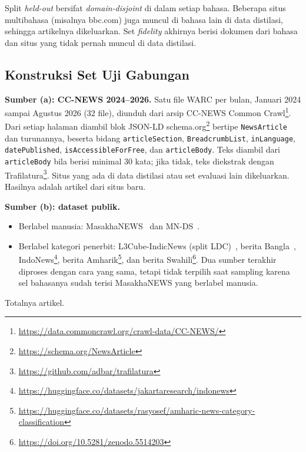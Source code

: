 \documentclass[journal]{IEEEtran}
\newcommand{\eng}[1]{\textit{#1}}   %
\begin{document}
Split \eng{held-out} bersifat \eng{domain-disjoint} di dalam setiap bahasa. Beberapa situs multibahasa (misalnya bbc.com) juga muncul di bahasa lain di data distilasi, sehingga artikelnya dikeluarkan. Set \eng{fidelity} akhirnya berisi  dokumen dari  bahasa dan  situs yang tidak pernah muncul di data distilasi.

\subsection{Konstruksi Set Uji Gabungan}
\label{sec:testset}
\textbf{Sumber (a): CC-NEWS 2024--2026.} Satu file WARC per bulan, Januari 2024 sampai Agustus 2026 (32 file), diunduh dari arsip CC-NEWS Common Crawl\footnote{\url{https://data.commoncrawl.org/crawl-data/CC-NEWS/}}. Dari setiap halaman diambil blok JSON-LD schema.org\footnote{\url{https://schema.org/NewsArticle}} bertipe \texttt{NewsArticle} dan turunannya, beserta bidang \texttt{articleSection}, \texttt{BreadcrumbList}, \texttt{inLanguage}, \texttt{datePublished}, \texttt{isAccessibleForFree}, dan \texttt{articleBody}. Teks diambil dari \texttt{articleBody} bila berisi minimal 30 kata; jika tidak, teks diekstrak dengan Trafilatura\footnote{\url{https://github.com/adbar/trafilatura}}. Situs yang ada di data distilasi atau set evaluasi lain dikeluarkan. Hasilnya adalah  artikel dari situs baru.

\textbf{Sumber (b): dataset publik.}
\begin{itemize}
  \item Berlabel manusia: MasakhaNEWS~\cite{adelani2023masakhanews} dan MN-DS~\cite{petukhova2023mnds}.
  \item Berlabel kategori penerbit: L3Cube-IndicNews (split LDC)~\cite{mirashi2023indicnews}, berita Bangla~\cite{hossain2025banglanews}, IndoNews\footnote{\url{https://huggingface.co/datasets/jakartaresearch/indonews}}, berita Amharik\footnote{\url{https://huggingface.co/datasets/rasyosef/amharic-news-category-classification}}, dan berita Swahili\footnote{\url{https://doi.org/10.5281/zenodo.5514203}}. Dua sumber terakhir diproses dengan cara yang sama, tetapi tidak terpilih saat sampling karena sel bahasanya sudah terisi MasakhaNEWS yang berlabel manusia.
\end{itemize}
Totalnya  artikel.
\end{document}
